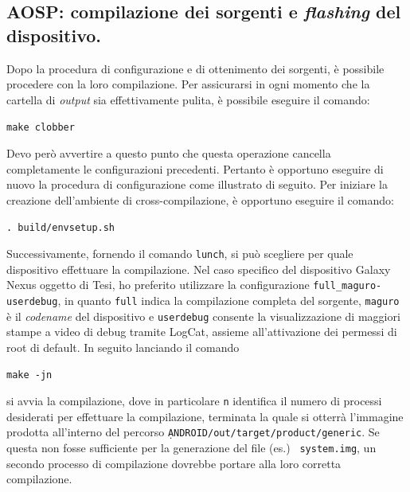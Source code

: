 \subsection{AOSP: compilazione dei sorgenti e \textit{flashing} del dispositivo.}\label{subsec:compileaosp}
Dopo la procedura di configurazione e di ottenimento dei sorgenti, è possibile
procedere con la loro compilazione. Per assicurarsi in ogni momento che la 
cartella di \textit{output} sia effettivamente pulita, è possibile 
eseguire il comando:
\begin{center}
\texttt{\small make clobber}
\end{center}
Devo però avvertire a questo punto che questa operazione cancella completamente
le configurazioni precedenti. Pertanto è opportuno eseguire di nuovo
la procedura di configurazione come illustrato di seguito.
Per iniziare la creazione dell'ambiente di cross-compilazione, è opportuno
eseguire il comando:
\begin{center}
\texttt{\small . build/envsetup.sh}
\end{center}
Successivamente, fornendo il comando \texttt{\small lunch}, si può scegliere per
quale dispositivo effettuare la compilazione. Nel
caso specifico del dispositivo Galaxy Nexus oggetto di Tesi, ho preferito utilizzare
la configurazione \texttt{\small full\_maguro-userdebug}, in quanto \texttt{\small full}
indica la compilazione completa del sorgente, \texttt{\small maguro} è il \textit{codename}
del dispositivo e \texttt{\small userdebug} consente la visualizzazione di maggiori
stampe a video di debug tramite LogCat, assieme all'attivazione dei permessi di
root di default. In seguito lanciando il comando
\begin{center}
\texttt{\small make -jn}
\end{center}
si avvia la compilazione, dove in particolare \texttt{\small n} identifica il numero
di processi desiderati per effettuare la compilazione, terminata la quale
si otterrà l'immagine prodotta all'interno del percorso \texttt{\small \d ANDROID/out/target/product/generic}.
Se questa non fosse sufficiente per la generazione del file (es.) \texttt{\small
system.img}, un secondo processo di compilazione dovrebbe portare alla loro 
corretta compilazione.
\medskip

